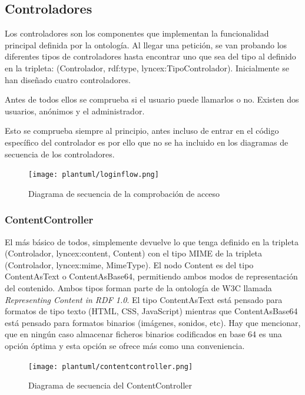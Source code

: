 \documentclass[12pt]{report} %
\begin{document}
\subsection{Controladores}
Los controladores son los componentes que implementan la funcionalidad principal definida por la ontología.
Al llegar una petición, se van probando los diferentes tipos de controladores hasta encontrar uno que sea del tipo al definido en la tripleta: (Controlador, rdf:type, lyncex:TipoControlador).
Inicialmente se han diseñado cuatro controladores.

Antes de todos ellos se comprueba si el usuario puede llamarlos o no. Existen dos usuarios, anónimos y el administrador.

Esto se comprueba siempre al principio, antes incluso de entrar en el código específico del controlador es por ello que no se ha incluido en los diagramas de secuencia de los controladores.

\begin{figure}[h]
    \centering
    \texttt{[image: plantuml/loginflow.png]}
    \caption{Diagrama de secuencia de la comprobación de acceso}
    \label{fig:loginflow}
\end{figure}

\subsubsection{ContentController}
El más básico de todos, simplemente devuelve lo que tenga definido en la tripleta (Controlador, lyncex:content, Content) con el tipo MIME 
de la tripleta (Controlador, lyncex:mime, MimeType). El nodo Content es del tipo ContentAsText o ContentAsBase64, permitiendo ambos modos de representación del contenido.
Ambos tipos forman parte de la ontología de W3C llamada \textit{Representing Content in RDF 1.0}\cite{cnt}.
El tipo ContentAsText está pensado para formatos de tipo texto (HTML, CSS, JavaScript) mientras que ContentAsBase64 está pensado para formatos binarios (imágenes, sonidos, etc).
Hay que mencionar, que en ningún caso almacenar ficheros binarios codificados en base 64 es una opción óptima y esta opción se ofrece más como una conveniencia.

\begin{figure}[h]
    \centering
    \texttt{[image: plantuml/contentcontroller.png]}
    \caption{Diagrama de secuencia del ContentController}
    \label{fig:contentcontroller}
\end{figure}
\end{document}
